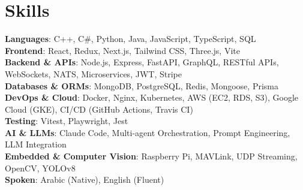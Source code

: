 \documentclass[letterpaper,10pt]{article}
\begin{document}
  \section{Skills}
   \begin{itemize}[leftmargin=0.15in, label={}]
      \small{\item{
       \textbf{Languages}{: C++, C\#, Python, Java, JavaScript, TypeScript, SQL} \\
       \textbf{Frontend}{: React, Redux, Next.js, Tailwind CSS, Three.js, Vite} \\
       \textbf{Backend \& APIs}{: Node.js, Express, FastAPI, GraphQL, RESTful APIs, WebSockets, NATS, Microservices, JWT, Stripe} \\
       \textbf{Databases \& ORMs}{: MongoDB, PostgreSQL, Redis, Mongoose, Prisma} \\
       \textbf{DevOps \& Cloud}{: Docker, Nginx, Kubernetes, AWS (EC2, RDS, S3), Google Cloud (GKE), CI/CD (GitHub Actions, Travis CI)} \\
       \textbf{Testing}{: Vitest, Playwright, Jest} \\
       \textbf{AI \& LLMs}{: Claude Code, Multi-agent Orchestration, Prompt Engineering, LLM Integration} \\
       \textbf{Embedded \& Computer Vision}{: Raspberry Pi, MAVLink, UDP Streaming, OpenCV, YOLOv8} \\
       \textbf{Spoken}{: Arabic (Native), English (Fluent)}
      }}
   \end{itemize}
\end{document}
